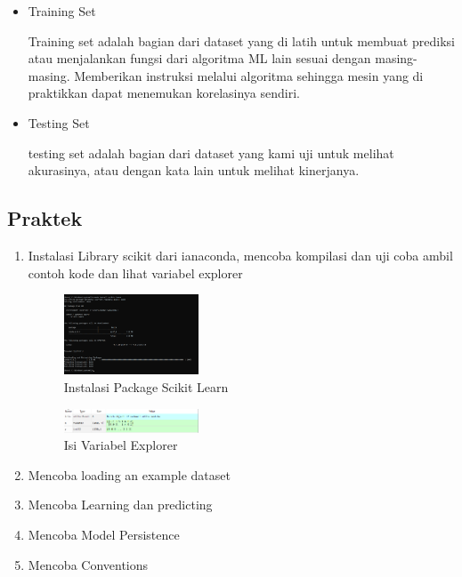 \begin{enumerate}
\begin{itemize}
	\item Training Set
		\par Training set adalah bagian dari dataset yang di latih untuk membuat prediksi atau menjalankan fungsi dari algoritma ML lain sesuai dengan masing-masing. Memberikan instruksi melalui algoritma sehingga mesin yang di praktikkan dapat menemukan korelasinya sendiri.
		
	\item Testing Set
		\par testing set adalah bagian dari dataset yang kami uji untuk melihat akurasinya, atau dengan kata lain untuk melihat kinerjanya.
	\end{itemize}
\end{enumerate}
\subsection{Praktek}
\begin{enumerate}
	\item Instalasi Library scikit dari ianaconda, mencoba kompilasi dan uji coba ambil contoh kode dan lihat variabel explorer
	\hfill\break
	\begin{figure}[H]
		\includegraphics[width=4cm]{figures/1174087/1/instalasi.png}
		\centering
		\caption{Instalasi Package Scikit Learn}
	\end{figure}
	\begin{figure}[H]
		\includegraphics[width=4cm]{figures/1174087/1/variable.png}
		\centering
		\caption{Isi Variabel Explorer}
	\end{figure}
	\item Mencoba loading an example dataset
	\hfill\break
	
	\item Mencoba Learning dan predicting
	\hfill\break
	
	\item Mencoba Model Persistence
	\hfill\break
	
	\item Mencoba Conventions
	\hfill\break
	
\end{enumerate}

